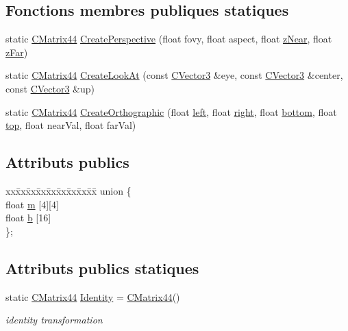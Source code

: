 \subsection*{Fonctions membres publiques statiques}
\begin{DoxyCompactItemize}
\item 
static \hyperlink{class_c_matrix44}{C\-Matrix44} \hyperlink{class_c_matrix44_ade53879722c73f788672f122ce79384d}{Create\-Perspective} (float fovy, float aspect, float \hyperlink{glext_8h_a12d99226e590bbaaf0be69169eeb4834}{z\-Near}, float \hyperlink{glext_8h_a18a2583fe65967bceff8903e2769f8e2}{z\-Far})
\item 
static \hyperlink{class_c_matrix44}{C\-Matrix44} \hyperlink{class_c_matrix44_acb0ca1cac92022effb2781b5e56c532a}{Create\-Look\-At} (const \hyperlink{class_c_vector3}{C\-Vector3} \&eye, const \hyperlink{class_c_vector3}{C\-Vector3} \&center, const \hyperlink{class_c_vector3}{C\-Vector3} \&up)
\item 
static \hyperlink{class_c_matrix44}{C\-Matrix44} \hyperlink{class_c_matrix44_a9300c08531de617b22d861687cfe0ea6}{Create\-Orthographic} (float \hyperlink{glext_8h_a85b8f6c07fbc1fb5d77c2ae090f21995}{left}, float \hyperlink{glext_8h_a5ffadbbacc6b89cf6218bc43b384d3fe}{right}, float \hyperlink{glext_8h_a95fc257e5ddf46f7db9d5e898cdf1991}{bottom}, float \hyperlink{glext_8h_a5ab323daeacf8dfdb8f91132fecdca23}{top}, float near\-Val, float far\-Val)
\end{DoxyCompactItemize}
\subsection*{Attributs publics}
\begin{DoxyCompactItemize}
\item 
\begin{tabbing}
xx\=xx\=xx\=xx\=xx\=xx\=xx\=xx\=xx\=\kill
union \{\\
\>float \hyperlink{class_c_matrix44_a0cdad394489ff192554c7f29ca5ae78a}{m} \mbox{[}4\mbox{]}\mbox{[}4\mbox{]}\\
\>float \hyperlink{class_c_matrix44_a5977be8ee90c365cb2e14be49f749739}{b} \mbox{[}16\mbox{]}\\
\}; \\

\end{tabbing}\end{DoxyCompactItemize}
\subsection*{Attributs publics statiques}
\begin{DoxyCompactItemize}
\item 
static \hyperlink{class_c_matrix44}{C\-Matrix44} \hyperlink{class_c_matrix44_a18198dedeaf35ac255b368f5c54ceed0}{Identity} = \hyperlink{class_c_matrix44}{C\-Matrix44}()
\begin{DoxyCompactList}\small\item\em identity transformation \end{DoxyCompactList}\end{DoxyCompactItemize}


